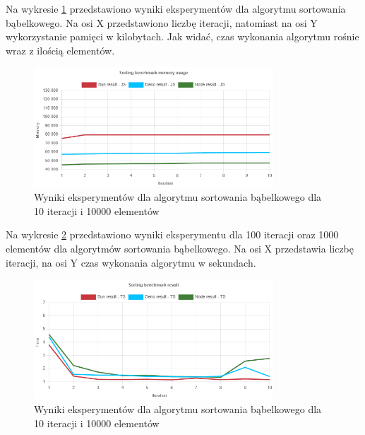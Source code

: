 Na wykresie \ref{fig:bubble_sorting_e4_memory_js} przedstawiono wyniki eksperymentów dla algorytmu sortowania bąbelkowego. Na osi X przedstawiono liczbę iteracji, natomiast na osi Y wykorzystanie pamięci w kilobytach. Jak widać, czas wykonania algorytmu rośnie wraz z ilością elementów.
\begin{figure}[H]
  \centering
  \includegraphics[width=0.8\textwidth]{Figures/sorting/bubble/e4_memory_js.png}
  \caption{Wyniki eksperymentów dla algorytmu sortowania bąbelkowego dla 10 iteracji i 10000 elementów}
  \label{fig:bubble_sorting_e4_memory_js}
\end{figure}

Na wykresie \ref{fig:bubble_sorting_e4_ts} przedstawiono wyniki eksperymentu dla 100 iteracji oraz 1000 elementów dla algorytmów sortowania bąbelkowego. Na osi X przedstawia liczbę iteracji, na osi Y czas wykonania algorytmu w sekundach. 

\begin{figure}[H]
  \centering
  \includegraphics[width=0.8\textwidth]{Figures/sorting/bubble/e4_ts.png}
  \caption{Wyniki eksperymentów dla algorytmu sortowania bąbelkowego dla 10 iteracji i 10000 elementów}
  \label{fig:bubble_sorting_e4_ts}
\end{figure}

